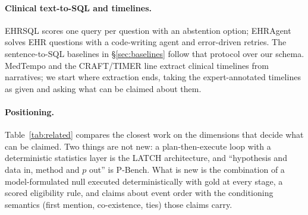 \paragraph{Clinical text-to-SQL and timelines.} EHRSQL \cite{lee2022ehrsql}
scores one query per question with an abstention option; EHRAgent
\cite{shi2024ehragent} solves EHR questions with a code-writing agent and
error-driven retries. The sentence-to-SQL baselines in \S\ref{sec:baselines}
follow that protocol over our schema. MedTempo and the CRAFT/TIMER line
\cite{craft2026,timer2025} extract clinical timelines from narratives; we start
where extraction ends, taking the expert-annotated timelines as given and
asking what can be claimed about them.

\paragraph{Positioning.} Table~\ref{tab:related} compares the closest work on
the dimensions that decide what can be claimed. Two things are not new: a
plan-then-execute loop with a deterministic statistics layer is the LATCH
architecture, and ``hypothesis and data in, method and $p$ out'' is P-Bench.
What is new is the combination of a model-formulated null executed
deterministically with gold at every stage, a scored eligibility rule, and
claims about event order with the conditioning semantics (first mention,
co-existence, ties) those claims carry.

